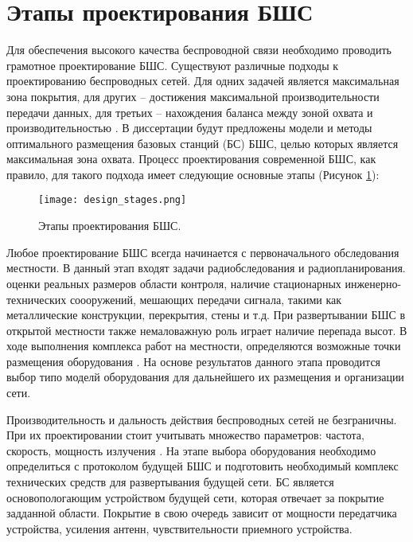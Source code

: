 \section{Этапы проектирования БШС}

Для обеспечения высокого качества беспроводной связи необходимо проводить грамотное проектирование БШС. Существуют различные подходы к проектированию беспроводных сетей. Для одних задачей является максимальная зона покрытия, для других -- достижения максимальной производительности передачи данных, для третьих -- нахождения баланса между зоной охвата и производительностью \cite{Proletarsky}. В диссертации будут предложены модели и методы оптимального размещения базовых станций (БС) БШС, целью которых является максимальная зона охвата.  Процесс проектирования современной БШС, как правило, для такого подхода имеет следующие основные этапы (Рисунок \cref{fig:part1_design_stages}):

\begin{figure}[h!]
  \centering
   \texttt{[image: design\_stages.png]}
\caption{Этапы проектирования БШС.}
\label{fig:part1_design_stages}
\end{figure}

Любое проектирование БШС всегда начинается с первоначального обследования местности. В данный этап входят задачи радиобследования и радиопланирования. оценки реальных размеров области контроля, наличие стационарных инженерно-технических соооружений, мешающих передачи сигнала, такими как металлические конструкции, перекрытия, стены и т.д. При развертывании БШС в открытой местности также немаловажную роль играет наличие перепада высот. В ходе выполнения комплекса работ на местности, определяются возможные точки размещения оборудования \cite{Dunaitsev2017}. На основе результатов данного этапа проводится выбор типо моделй оборудования для дальнейшего их размещения и организации сети.

Производительность и дальность действия беспроводных сетей не безграничны. При их проектировании стоит учитывать множество параметров: частота, скорость, мощность излучения \cite{Proletarsky}. На этапе выбора оборудования необходимо определиться с протоколом будущей БШС и  подготовить необходимый комплекс технических средств для развертывания будущей сети. БС является основопологающим устройством будущей сети, которая отвечает за покрытие задданной области. Покрытие в свою очередь зависит от мощности передатчика устройства, усиления антенн, чувствительности приемного устройства.


